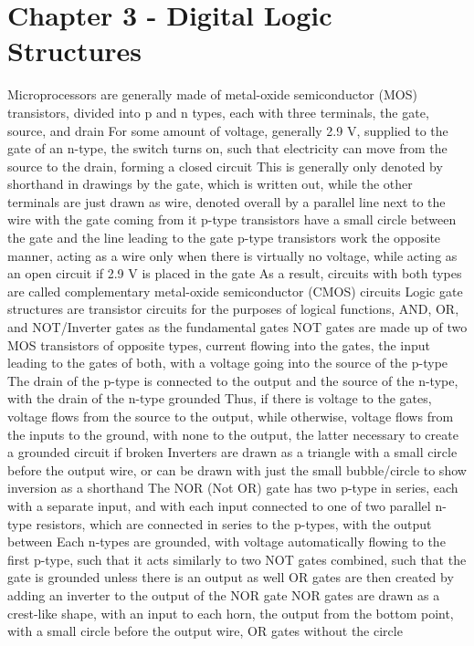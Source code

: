 \documentclass[11 pt, twoside]{article}
\newenvironment{outline*}
{
	\begin{outline}[enumerate]
	}
	{\end{outline}
}
\begin{document}
\section{Chapter 3 - Digital Logic Structures}
\begin{outline*}
\1 Microprocessors are generally made of metal-oxide semiconductor (MOS) transistors, divided into p and n types, each with three terminals, the gate, source, and drain
\2 For some amount of voltage, generally 2.9 V, supplied to the gate of an n-type, the switch turns on, such that electricity can move from the source to the drain, forming a closed circuit
\3 This is generally only denoted by shorthand in drawings by the gate, which is written out, while the other terminals are just drawn as wire, denoted overall by a parallel line next to the wire with the gate coming from it
\3 p-type transistors have a small circle between the gate and the line leading to the gate
\2 p-type transistors work the opposite manner, acting as a wire only when there is virtually no voltage, while acting as an open circuit if 2.9 V is placed in the gate
\2 As a result, circuits with both types are called complementary metal-oxide semiconductor (CMOS) circuits
\1 Logic gate structures are transistor circuits for the purposes of logical functions, AND, OR, and NOT/Inverter gates as the fundamental gates
\2 NOT gates are made up of two MOS transistors of opposite types, current flowing into the gates, the input leading to the gates of both, with a voltage going into the source of the p-type
\3 The drain of the p-type is connected to the output and the source of the n-type, with the drain of the n-type grounded
\3 Thus, if there is voltage to the gates, voltage flows from the source to the output, while otherwise, voltage flows from the inputs to the ground, with none to the output, the latter necessary to create a grounded circuit if broken
\3 Inverters are drawn as a triangle with a small circle before the output wire, or can be drawn with just the small bubble/circle to show inversion as a shorthand
\2 The NOR (Not OR) gate has two p-type in series, each with a separate input, and with each input connected to one of two parallel n-type resistors, which are connected in series to the p-types, with the output between
\3 Each n-types are grounded, with voltage automatically flowing to the first p-type, such that it acts similarly to two NOT gates combined, such that the gate is grounded unless there is an output as well
\3 OR gates are then created by adding an inverter to the output of the NOR gate
\3 NOR gates are drawn as a crest-like shape, with an input to each horn, the output from the bottom point, with a small circle before the output wire, OR gates without the circle

\end{outline*}
\end{document}
